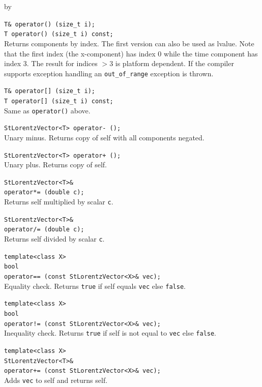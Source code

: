 \documentclass[twoside]{article}
\newcommand{\comp}[1]{\texttt{#1}}%
\newcommand{\entrylabel}[1]{\mbox{\textbf{{#1}}}\hfil}%
\newenvironment{entry}
{\begin{list}{}%
    {\renewcommand{\makelabel}{\entrylabel}%
     \setlength{\labelwidth}{90pt}%
     \setlength{\leftmargin}{\labelwidth}
     \advance\leftmargin by \labelsep%
      }%
    }%
  {\end{list}}
\newcommand{\Entrylabel}[1]%
{\raisebox{0pt}[1ex][0pt]{\makebox[\labelwidth][l]%
    {\parbox[t]{\labelwidth}{\hspace{0pt}\textbf{{#1}}}}}}
\newenvironment{Entry}%
{\renewcommand{\entrylabel}{\Entrylabel}\begin{entry}}%
  {\end{entry}}
\begin{document}
\begin{description}
\begin{Entry}
    \verb+T& operator() (size_t i);+\\
    \verb+T operator() (size_t i) const;+\\
    Returns components by index. The first version can also be used as
    lvalue. Note that the first index (the x-component) has index 0
    while the time component has index 3.  The result for indices $>
    3$ is platform dependent. If the compiler supports exception
    handling an \comp{out\_of\_range} exception is thrown.
    
    \verb+T& operator[] (size_t i);+\\
    \verb+T operator[] (size_t i) const;+\\
    Same as \comp{operator()} above.

    \verb+StLorentzVector<T> operator- ();+\\
    Unary minus. Returns copy of self with all components negated.
    
    \verb#StLorentzVector<T> operator+ ();#\\
    Unary plus. Returns copy of self.
    
    \verb+StLorentzVector<T>&+\\
    \verb+operator*= (double c);+\\
    Returns self multiplied by scalar \comp{c}.
    
    \verb+StLorentzVector<T>&+\\
    \verb+operator/= (double c);+\\
    Returns self divided by scalar \comp{c}.
    
    \verb+template<class X>+\\
    \verb+bool+\\
    \verb+operator== (const StLorentzVector<X>& vec);+\\
    Equality check. Returns \comp{true} if self equals
    \comp{vec} else \comp{false}.
    
    \verb+template<class X>+\\
    \verb+bool+\\
    \verb+operator!= (const StLorentzVector<X>& vec);+\\
    Inequality check. Returns \comp{true} if self is not equal to
    \comp{vec} else \comp{false}.
    
    \verb+template<class X>+\\
    \verb+StLorentzVector<T>&+\\
    \verb#operator+= (const StLorentzVector<X>& vec);#\\
    Adds \comp{vec} to self and returns self.
    

\end{Entry}
\end{description}
\end{document}
